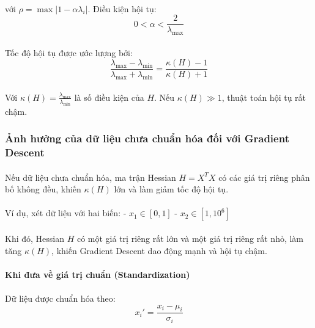 \paragraph{}{với \( \rho = \max |1 - \alpha \lambda_i| \). Điều kiện hội tụ:}
\[
0 < \alpha < \frac{2}{\lambda_{\max}}
\]
\paragraph{}{Tốc độ hội tụ được ước lượng bởi:}
\[
\frac{\lambda_{\max} - \lambda_{\min}}{\lambda_{\max} + \lambda_{\min}} = \frac{\kappa(H) - 1}{\kappa(H) + 1}
\]
\paragraph{}{Với \( \kappa(H) = \frac{\lambda_{\max}}{\lambda_{\min}} \) là số điều kiện của \( H \).
Nếu \( \kappa(H) \gg 1 \), thuật toán hội tụ rất chậm.}

\subsubsection{Ảnh hưởng của dữ liệu chưa chuẩn hóa đối với Gradient Descent}

\paragraph{}{Nếu dữ liệu chưa chuẩn hóa, ma trận Hessian \( H = X^T X \) có các giá trị riêng phân bố không đều, khiến \( \kappa(H) \) lớn và làm giảm tốc độ hội tụ.}

\paragraph{}{Ví dụ, xét dữ liệu với hai biến:
- \( x_1 \in [0,1] \)
- \( x_2 \in [1,10^6] \)}

\paragraph{}{Khi đó, Hessian \( H \) có một giá trị riêng rất lớn và một giá trị riêng rất nhỏ, làm tăng \( \kappa(H) \), khiến Gradient Descent dao động mạnh và hội tụ chậm.}

\paragraph{}{\textbf{Khi đưa về giá trị chuẩn (Standardization)}}
\paragraph{}{Dữ liệu được chuẩn hóa theo:}
\[
x_i' = \frac{x_i - \mu_i}{\sigma_i}
\]
